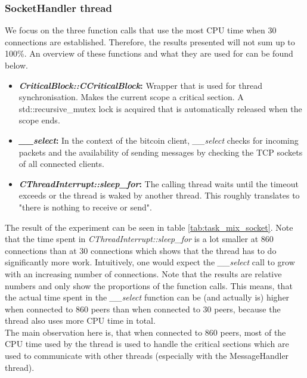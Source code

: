 \subsubsection{SocketHandler thread}
We focus on the three function calls that use the most CPU time when 30 connections are established. Therefore, the results presented will not sum up to 100\%. An overview of these functions and what they are used for can be found below.
\begin{itemize}
	\item \textbf{\textit{CriticalBlock::CCriticalBlock}:} Wrapper that is used for thread synchronisation. Makes the current scope a critical section. A std::recursive\_mutex lock is acquired that is automatically released when the scope ends.
	\item \textbf{\textit{\_\_select}:} In the context of the bitcoin client, \textit{\_\_select} checks for incoming packets and the availability of sending messages by checking the TCP sockets of all connected clients.
	\item \textbf{\textit{CThreadInterrupt::sleep\_for}:} The calling thread waits until the timeout exceeds or the thread is waked by another thread. This roughly translates to "there is nothing to receive or send".
\end{itemize}
The result of the experiment can be seen in table \ref{tab:task_mix_socket}. Note that the time spent in \textit{CThreadInterrupt::sleep\_for} is a lot smaller at 860 connections than at 30 connections which shows that the thread has to do significantly more work. Intuitively, one would expect the \textit{\_\_select} call to grow with an increasing number of connections. Note that the results are relative numbers and only show the proportions of the function calls. This means, that the actual time spent in the \textit{\_\_select} function can be (and actually is) higher when connected to 860 peers than when connected to 30 peers, because the thread also uses more CPU time in total.\\
The main observation here is, that when connected to 860 peers, most of the CPU time used by the thread is used to handle the critical sections which are used to communicate with other threads (especially with the MessageHandler thread). 

